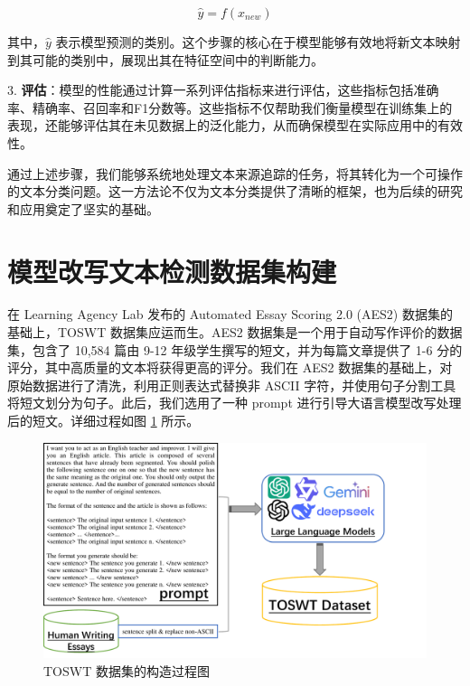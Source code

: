    \[
   \hat{y} = f(x_{new})
   \]

   其中，\( \hat{y} \) 表示模型预测的类别。这个步骤的核心在于模型能够有效地将新文本映射到其可能的类别中，展现出其在特征空间中的判断能力。

3. \textbf{评估}：模型的性能通过计算一系列评估指标来进行评估，这些指标包括准确率、精确率、召回率和F1分数等。这些指标不仅帮助我们衡量模型在训练集上的表现，还能够评估其在未见数据上的泛化能力，从而确保模型在实际应用中的有效性。

通过上述步骤，我们能够系统地处理文本来源追踪的任务，将其转化为一个可操作的文本分类问题。这一方法论不仅为文本分类提供了清晰的框架，也为后续的研究和应用奠定了坚实的基础。


\section{模型改写文本检测数据集构建}
\label{sec:TOSWT-gen}

在 Learning Agency Lab 发布的 Automated Essay Scoring 2.0 (AES2) 数据集的基础上，TOSWT 数据集应运而生。AES2 数据集是一个用于自动写作评价的数据集，包含了 10,584 篇由 9-12 年级学生撰写的短文，并为每篇文章提供了 1-6 分的评分，其中高质量的文本将获得更高的评分。我们在 AES2 数据集的基础上，对原始数据进行了清洗，利用正则表达式替换非 ASCII 字符，并使用句子分割工具将短文划分为句子。此后，我们选用了一种 prompt 进行引导大语言模型改写处理后的短文。详细过程如图 \ref{fig:dataset-construct} 所示。

\begin{figure}[htbp]
    \centering
    \includegraphics[trim=0 0 150 0, width=\textwidth]{figures/dataset-construct.pdf}
    \caption{TOSWT 数据集的构造过程图}
    \label{fig:dataset-construct}
\end{figure}

